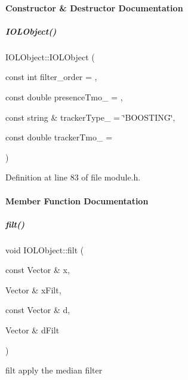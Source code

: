 \paragraph{Constructor \& Destructor Documentation}
\mbox{\label{group__iol2opc_a4b46d29a6b84e8d9c99225a016fa4fff}} 
\subparagraph{\texorpdfstring{I\+O\+L\+Object()}{IOLObject()}}
{\footnotesize\ttfamily I\+O\+L\+Object\+::\+I\+O\+L\+Object (\begin{DoxyParamCaption}\item[{const int}]{filter\+\_\+order = {},  }\item[{const double}]{presence\+Tmo\+\_\+ = {},  }\item[{const string \&}]{tracker\+Type\+\_\+ = {\ttfamily \char`\"{}BOOSTING\char`\"{}},  }\item[{const double}]{tracker\+Tmo\+\_\+ = {} }\end{DoxyParamCaption})\hspace{0.3cm}{\ttfamily [inline]}}



Definition at line 83 of file module.\+h.



\paragraph{Member Function Documentation}
\mbox{\label{group__iol2opc_a04a024674f0499d660dfe683dca81bd3}} 
\subparagraph{\texorpdfstring{filt()}{filt()}}
{\footnotesize\ttfamily void I\+O\+L\+Object\+::filt (\begin{DoxyParamCaption}\item[{const Vector \&}]{x,  }\item[{Vector \&}]{x\+Filt,  }\item[{const Vector \&}]{d,  }\item[{Vector \&}]{d\+Filt }\end{DoxyParamCaption})\hspace{0.3cm}{\ttfamily [inline]}}



filt apply the median filter 


